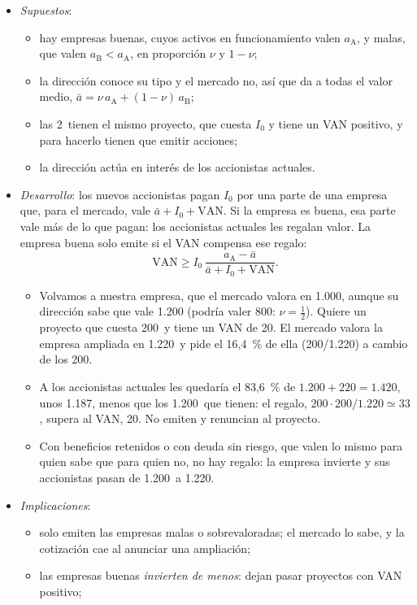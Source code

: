 \documentclass[11pt]{article}
\begin{document}
\begin{itemize}
\item \emph{Supuestos}:
  \begin{itemize}
  \item hay empresas buenas, cuyos activos en funcionamiento valen $a_{\mathrm A}$, y malas, que valen $a_{\mathrm B}<a_{\mathrm A}$, en proporción $\nu$ y $1-\nu$;
  \item la dirección conoce su tipo y el mercado no, así que da a todas el valor medio, $\bar a=\nu\,a_{\mathrm A}+(1-\nu)\,a_{\mathrm B}$;
  \item las 2~tienen el mismo proyecto, que cuesta $I_0$ y tiene un VAN positivo, y para hacerlo tienen que emitir acciones;
  \item la dirección actúa en interés de los accionistas actuales.
  \end{itemize}
\item \emph{Desarrollo}: los nuevos accionistas pagan $I_0$ por una parte de una empresa que, para el mercado, vale $\bar a+I_0+\mathrm{VAN}$. Si la empresa es buena, esa parte vale más de lo que pagan: los accionistas actuales les regalan valor. La empresa buena solo emite si el VAN compensa ese regalo:
  \[
  \mathrm{VAN}\geq I_0\,\frac{a_{\mathrm A}-\bar a}{\bar a+I_0+\mathrm{VAN}}.
  \]
  \begin{itemize}
  \item Volvamos a nuestra empresa, que el mercado valora en 1.000, aunque su dirección sabe que vale 1.200 (podría valer 800: $\nu=\tfrac12$). Quiere un proyecto que cuesta 200~y tiene un VAN de 20. El mercado valora la empresa ampliada en 1.220~y pide el 16,4~\% de ella (200/1.220) a cambio de los 200.
  \item A los accionistas actuales les quedaría el 83,6~\% de $1.200+220=1.420$, unos 1.187, menos que los 1.200~que tienen: el regalo, $200\cdot200/1.220\simeq33$, supera al VAN, 20. No emiten y renuncian al proyecto.
  \item Con beneficios retenidos o con deuda sin riesgo, que valen lo mismo para quien sabe que para quien no, no hay regalo: la empresa invierte y sus accionistas pasan de 1.200~a 1.220.
  \end{itemize}
\item \emph{Implicaciones}:
  \begin{itemize}
  \item solo emiten las empresas malas o sobrevaloradas; el mercado lo sabe, y la cotización cae al anunciar una ampliación;
  \item las empresas buenas \emph{invierten de menos}: dejan pasar proyectos con VAN positivo;

\end{itemize}
\end{itemize}
\end{document}
